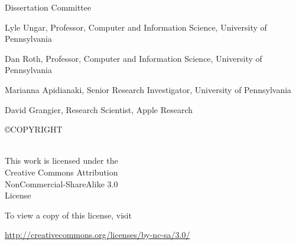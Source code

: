 \begin{titlepage}
\begin{flushleft}
\doublespacing

Dissertation Committee %

Lyle Ungar, Professor, Computer and Information Science, University of Pennsylvania

Dan Roth, Professor, Computer and Information Science, University of Pennsylvania

Marianna Apidianaki,  Senior Research Investigator, University of Pennsylvania

David Grangier, Research Scientist, Apple Research

\end{flushleft}

\end{titlepage}


\doublespacing

\thispagestyle{empty} %

\vspace*{\fill}

\begin{flushleft}
\mytitle

 \copyright \space COPYRIGHT
 
\myyear

\myauthorfull\\[24 pt] %

This work is licensed under the \\
Creative Commons Attribution \\
NonCommercial-ShareAlike 3.0 \\
License

To view a copy of this license, visit

\url{http://creativecommons.org/licenses/by-nc-sa/3.0/}

\end{flushleft}
\pagebreak 




